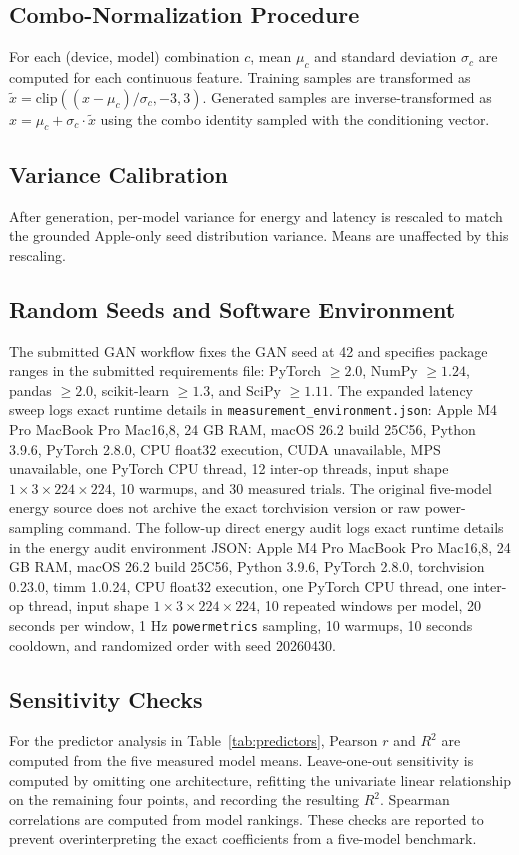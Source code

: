 \documentclass{svproc}
\begin{document}
\subsection{Combo-Normalization Procedure}
For each (device, model) combination $c$, mean $\mu_c$ and standard deviation
$\sigma_c$ are computed for each continuous feature. Training samples are
transformed as $\tilde{x} = \mathrm{clip}((x - \mu_c)/\sigma_c, -3, 3)$.
Generated samples are inverse-transformed as $x = \mu_c + \sigma_c \cdot \tilde{x}$
using the combo identity sampled with the conditioning vector.

\subsection{Variance Calibration}
After generation, per-model variance for energy and latency is rescaled to
match the grounded Apple-only seed distribution variance. Means are unaffected
by this rescaling.

\subsection{Random Seeds and Software Environment}
The submitted GAN workflow fixes the GAN seed at 42 and specifies package
ranges in the submitted requirements file: PyTorch $\geq 2.0$, NumPy
$\geq 1.24$, pandas $\geq 2.0$, scikit-learn $\geq 1.3$, and SciPy
$\geq 1.11$. The expanded latency sweep logs exact runtime details in
\texttt{measurement\_environment.json}: Apple M4 Pro MacBook Pro Mac16,8,
24 GB RAM, macOS 26.2 build 25C56, Python 3.9.6, PyTorch 2.8.0, CPU float32
execution, CUDA unavailable, MPS unavailable, one PyTorch CPU thread, 12
inter-op threads, input shape $1 \times 3 \times 224 \times 224$, 10 warmups,
and 30 measured trials. The original five-model energy source does not archive
the exact torchvision version or raw power-sampling command. The follow-up
direct energy audit logs exact runtime details in the energy audit environment
JSON: Apple M4 Pro MacBook Pro Mac16,8, 24 GB RAM, macOS 26.2 build
25C56, Python 3.9.6, PyTorch 2.8.0, torchvision 0.23.0, timm 1.0.24, CPU
float32 execution, one PyTorch CPU thread, one inter-op thread, input shape
$1 \times 3 \times 224 \times 224$, 10 repeated windows per model, 20 seconds
per window, 1 Hz \texttt{powermetrics} sampling, 10 warmups, 10 seconds
cooldown, and randomized order with seed 20260430.

\subsection{Sensitivity Checks}
For the predictor analysis in Table~\ref{tab:predictors}, Pearson $r$ and
$R^2$ are computed from the five measured model means. Leave-one-out
sensitivity is computed by omitting one architecture, refitting the univariate
linear relationship on the remaining four points, and recording the resulting
$R^2$. Spearman correlations are computed from model rankings. These checks
are reported to prevent overinterpreting the exact coefficients from a
five-model benchmark.
\end{document}
